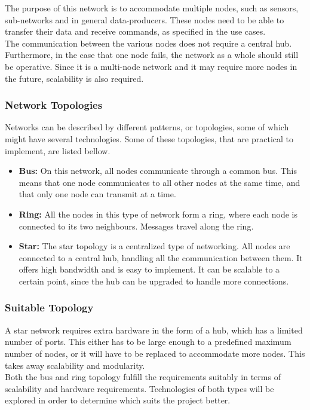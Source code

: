 The purpose of this network is to accommodate multiple nodes, such as sensors, sub-networks and in general data-producers.
These nodes need to be able to transfer their data and receive commands, as specified in the use cases.
\\
The communication between the various nodes does not require a central hub.
Furthermore, in the case that one node fails, the network as a whole should still be operative.
Since it is a multi-node network and it may require more nodes in the future, scalability is also required.

\subsubsection*{Network Topologies}
Networks can be described by different patterns, or topologies, some of which might have several technologies.
Some of these topologies, that are practical to implement, are listed bellow.
\begin{itemize}
\item \textbf{Bus:}
On this network, all nodes communicate through a common bus. 
This means that one node communicates to all other nodes at the same time, and that only one node can transmit at a time.
\item \textbf{Ring:} All the nodes in this type of network form a ring, where each node is connected to its two neighbours.
Messages travel along the ring.
\item \textbf{Star:} The star topology is a centralized type of networking.
All nodes are connected to a central hub, handling all the communication between them.
It offers high bandwidth and is easy to implement.
It can be scalable to a certain point, since the hub can be upgraded to handle more connections.
\end{itemize}

\subsubsection*{Suitable Topology}

A star network requires extra hardware in the form of a hub, which has a limited number of ports. 
This either has to be large enough to a predefined maximum number of nodes, or it will have to be replaced to accommodate more nodes.
This takes away scalability and modularity.\\

Both the bus and ring topology fulfill the requirements suitably in terms of scalability and hardware requirements.
Technologies of both types will be explored in order to determine which suits the project better.

